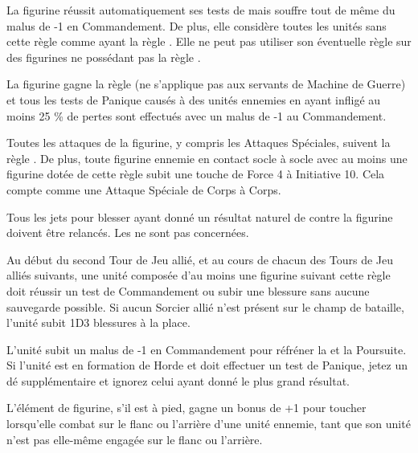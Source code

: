 \armyspecialruleentry{\chosenofashuruk{}}

La figurine réussit automatiquement ses tests de \fear{} mais souffre tout de même du malus de -1 en Commandement. De plus, elle considère toutes les unités sans cette règle comme ayant la règle \insignificant{}. Elle ne peut pas utiliser son éventuelle règle \engineer{} sur des figurines ne possédant pas la règle \chosenofashuruk{}.

\armyspecialruleentry{\daemonicinfusion{}}

La figurine gagne la règle \magicalattacks{} (ne s'applique pas aux servants de Machine de Guerre) et tous les tests de Panique causés à des unités ennemies en ayant infligé au moins 25 \% de pertes sont effectués avec un malus de -1 au Commandement.

\armyspecialruleentry{\volcanicembrace{}}

Toutes les attaques de la figurine, y compris les Attaques Spéciales, suivent la règle \flamingattacks{}. De plus, toute figurine ennemie en contact socle à socle avec au moins une figurine dotée de cette règle subit une touche de Force 4 à Initiative 10. Cela compte comme une Attaque Spéciale de Corps à Corps.

\armyspecialruleentry{\shacklesoffire{}}

Tous les jets pour blesser ayant donné un résultat naturel de  contre la figurine doivent être relancés. Les \magicalattacks{} ne sont pas concernées.

Au début du second Tour de Jeu allié, et au cours de chacun des Tours de Jeu alliés suivants, une unité composée d'au moins une figurine suivant cette règle doit réussir un test de Commandement ou subir une blessure sans aucune sauvegarde possible. Si aucun Sorcier allié n'est présent sur le champ de bataille, l'unité subit 1D3 blessures à la place.

\armyspecialruleentry{\unruly{}}

L'unité subit un malus de -1 en Commandement pour réfréner la \frenzy{} et la Poursuite. Si l'unité est en formation de Horde et doit effectuer un test de Panique, jetez un dé supplémentaire et ignorez celui ayant donné le plus grand résultat.

\armyspecialruleentry{\opportunist{}}

L'élément de figurine, s'il est à pied, gagne un bonus de +1 pour toucher lorsqu'elle combat sur le flanc ou l'arrière d'une unité ennemie, tant que son unité n'est pas elle-même engagée sur le flanc ou l'arrière.

